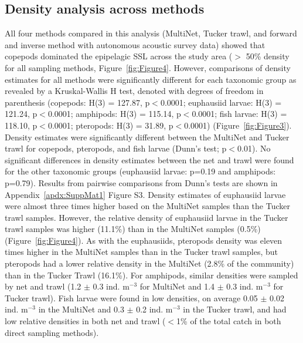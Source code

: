 
\subsection{Density analysis across methods}
All four methods compared in this analysis (MultiNet, Tucker trawl, and forward and inverse method with autonomous acoustic survey data) showed that copepods dominated the epipelagic SSL across the study area ($>$ 50\% density for all sampling methods, Figure~\ref{fig:Figure4}. However, comparisons of density estimates for all methods were significantly different for each taxonomic group as revealed by a Kruskal-Wallis H test, denoted with degrees of freedom in parenthesis (copepods: H(3) = 127.87, p$<$0.0001; euphausiid larvae: H(3) = 121.24, p$<$0.0001; amphipods: H(3) = 115.14, p$<$0.0001; fish larvae: H(3) = 118.10, p$<$0.0001; pteropods: H(3) = 31.89, p$<$0.0001) (Figure~\ref{fig:Figure3}).\\
Density estimates were significantly different between the MultiNet and Tucker trawl for copepods, pteropods, and fish larvae (Dunn's test; p$<$0.01). No significant differences in density estimates between the net and trawl were found for the other taxonomic groups (euphausiid larvae: p=0.19 and amphipods: p=0.79). Results from pairwise comparisons from Dunn's tests are shown in Appendix~\ref{apdx:SuppMat1} Figure S3. Density estimates of euphausiid larvae were almost three times higher based on the MultiNet samples than the Tucker trawl samples. However, the relative density of euphausiid larvae in the Tucker trawl samples was higher (11.1\%) than in the MultiNet samples (0.5\%) (Figure~\ref{fig:Figure4}). As with the euphausiids, pteropods density was eleven times higher in the MultiNet samples than in the Tucker trawl samples, but pteropods had a lower relative density in the MultiNet (2.8\% of the community) than in the Tucker Trawl (16.1\%). For amphipods, similar densities were sampled by net and trawl (1.2 $\pm$ 0.3 ind. m$^{-3}$ for MultiNet and 1.4 $\pm$ 0.3 ind. m$^{-3}$ for Tucker trawl). Fish larvae were found in low densities, on average 0.05 $\pm$ 0.02 ind. m$^{-3}$ in the MultiNet and 0.3 $\pm$ 0.2 ind. m$^{-3}$ in the Tucker trawl, and had low relative densities in both net and trawl ($<$1\% of the total catch in both direct sampling methods).\\
